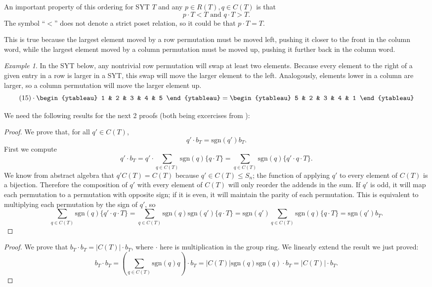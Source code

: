 \documentclass[12pt,twoside]{reedthesis}
\theoremstyle{plain}   %
\theoremstyle{definition}
\theoremstyle{remark}
\newtheorem{ex}{Example}[section]
\numberwithin{equation}{section}
\def\sgn{\mathrm{sgn}}
\begin{document}
   An important property of this ordering for SYT $T$ and any $p \in R(T), q\in C(T)$ is that
   \[ p \cdot T < T \text{ and } q \cdot T > T.\]
   The symbol ``$<$'' does not denote a strict poset relation, so it could be that $p \cdot T = T$. \par
   This is true because the largest element moved by a row permutation must be moved left, pushing it closer to the front in the column word,
   while the largest element moved by a column permutation must be moved up, pushing it further back in the column word.
   \begin{ex}
     In the SYT below, any nontrivial row permutation will swap at least two elements.
     Because every element to the right of a given entry in a row is larger in a SYT, this swap will move the larger element to the left.
     Analogously, elements lower in a column are larger, so a column permutation will move the larger element up.
     \[
       (15) \cdot 
       \begin{ytableau}
         1 & 2 & 3 & 4 & 5 
       \end{ytableau}
       =
       \begin{ytableau}
         5 & 2 & 3 & 4 & 1 
       \end{ytableau}
     \]
   \end{ex}

   We need the following results for the next 2 proofs (both being excercises from \cite{fulton}):
   \begin{proof}
     We prove that, for all $q' \in C(T)$,
     \[q' \cdot b_T = \sgn(q') b_T.\]
     First we compute
     \[q' \cdot b_T = q' \cdot \sum_{q \in C(T)} \sgn(q)\{q \cdot T\} = \sum_{q \in C(T)} \sgn(q)\{q' \cdot q \cdot T\}.\]
     We know from abstract algebra that $q' C(T) = C(T)$ because $q' \in C(T) \leq S_n$; the function of applying $q'$ to every element of $C(T)$ is a
     bijection.
     Therefore the composition of $q'$ with every element of $C(T)$ will only reorder the addends in the sum.
     If $q'$ is odd, it will map each permutation to a permutation with opposite sign; if it is even, it will maintain the parity of each permutation.
     This is equivalent to multiplying  each permutation by the sign of $q'$, so
     \[\sum_{q \in C(T)} \sgn(q)\{q' \cdot q \cdot T\} = \sum_{q \in C(T)} \sgn(q)\sgn(q') \{q \cdot T\}
       = \sgn(q') \sum_{q \in C(T)} \sgn(q) \{q \cdot T\} = \sgn(q') b_T.\]
   \end{proof}
   \begin{proof}
     We prove that $b_T \cdot b_T = |C(T)| \cdot b_T$, where $\cdot$ here is multiplication in the group ring.
     We linearly extend the result we just proved:
     \[ b_T \cdot b_T = (\sum_{q \in C(T)} \sgn(q)q) \cdot b_T = |C(T)|\sgn(q)\sgn(q) \cdot b_T = |C(T)| \cdot b_T.\]  
   \end{proof}
\end{document}
